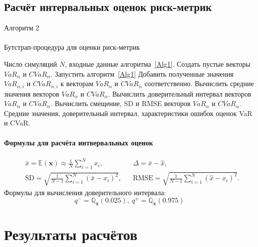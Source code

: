 \documentclass[aspectratio=169]{beamer}
\begin{document}
\subsection{Расчёт интервальных оценок риск-метрик}

\begin{frame}{Алгоритм 2}
    \framesubtitle{\insertsubsection}
    \begin{algorithm}[H]
    \footnotesize
   \caption{Бутстрап-процедура для оценки риск-метрик}
    \begin{algorithmic}[1]
    	\Require Число симуляций $N$, входные данные алгоритма~\ref{Alg1}.
    	\State Создать пустые векторы $\textit{VaR}_\alpha$ и $\textit{CVaR}_\alpha$.
    	    \State Запустить алгоритм~\ref{Alg1}
    	    \State Добавить полученные значения $\textit{VaR}_{\alpha, i}$ и $\textit{CVaR}_{\alpha, i}$ к векторам $\textit{VaR}_\alpha$ и $\textit{CVaR}_\alpha$ соответственно.
    	\EndFor
    	\State Вычислить средние значения векторов $\textit{VaR}_\alpha$ и $\textit{CVaR}_\alpha$.
    	\State Вычислить доверительный интервал векторов $\textit{VaR}_\alpha$ и $\textit{CVaR}_\alpha$.
    	\State Вычислить смещение, SD и RMSE векторов $\textit{VaR}_\alpha$ и $\textit{CVaR}_\alpha$.
    	\Ensure Средние значения, доверительный интервал, характеристики ошибок оценок VaR и CVaR.
    \end{algorithmic}
    \end{algorithm}
\end{frame}

\begin{frame}{{}}
    \framesubtitle{Формулы для расчёта интвервальных оценок}
    \begin{align}
        & \bar{x} = \mathbb{E} (\textbf{x}) \approx \frac{1}{N} \sum_{i=1}^N x_i, &
        & \Delta = \bar{x} - \hat{x}, \label{boot-bias} %
        \\
        & \text{SD} = \sqrt{\frac{1}{N-1} \sum_{i=1}^N (\bar{x} - x_i)^2}, &
        & \text{RMSE} = \sqrt{\frac{1}{N-1} \sum_{i=1}^N (\hat{x} - x_i)^2}.\nonumber
    \end{align}
    Формулы для вычисления доверительного интервала:
    \begin{equation}
        q^- = \mathbb{Q}_{\textbf{x}} (0.025), \ q^+ = \mathbb{Q}_{\textbf{x}} (0.975) %
    \end{equation}
\end{frame}

\section{Результаты расчётов}
\end{document}

